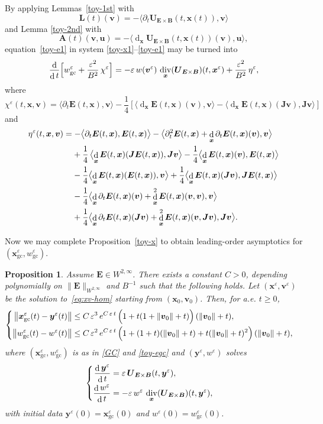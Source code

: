 \documentclass[JEP,XML,SOM,Unicode]{cedram}
\newenvironment{splitcases}
{\begin{cases}\begin{aligned}}
{\end{aligned}\end{cases}}
\newcommand{\blangle}{\bigl\langle}
\newcommand{\brangle}{\bigr\rangle}
\let\eps\varepsilon
\let\d\partial
\DeclareMathOperator\dD{d}\let\dd\dD
\DeclareMathOperator{\Div}{div}
\theoremstyle{plain}
\newtheorem{proposition}[theorem]{Proposition}
\theoremstyle{definition}
\newcommand{\be}{\begin{equation}}
\newcommand{\ee}{\end{equation}}
\newcommand{\bpr}{\begin{proposition}}
\newcommand{\epr}{\end{proposition}}
\newcommand\bA{{\boldsymbol A}}
\newcommand\bB{{\boldsymbol B}}
\newcommand\bE{{\boldsymbol E}}
\newcommand\bJ{{\boldsymbol J}}
\newcommand\bL{{\boldsymbol L}}
\newcommand\bU{{\boldsymbol U}}
\newcommand\bfu{{\boldsymbol u}}
\newcommand\bfv{{\boldsymbol v}}
\newcommand\bfx{{\boldsymbol x}}
\newcommand\bfy{{\boldsymbol y}}
\let\e w
\newcommand{\GC}{\bfx_\mathrm{gc}}
\newcommand{\eGC}{w_\mathrm{gc}}
\newcommand{\EcB}{\bU_{\bE\times\bB}}
\begin{document}
By applying Lemmas~\ref{toy-1st} with
\[
\bL(t)(\bfv)=
-\blangle\d_t\EcB(t,\bfx(t)),\bfv\brangle
\]
and Lemma \ref{toy-2nd} with
\[
\bA(t)(\bfv,\bfu) =
-\blangle\dD_\bfx\EcB(t,\bfx(t))(\bfv),\bfu\brangle,
\]
equation~\eqref{toy-e1} in system \eqref{toy-x1}--\eqref{toy-e1} may be turned into
\be
\label{toy-e2}
\frac{\dD}{\dD t}\Bigl[\eGC^\eps+\frac{\eps^2}{B^2}\,\chi^\eps\Bigr]
=-\eps\,\e(\bfv^\eps)\,\Div_\bfx(\EcB)(t,\bfx^\eps)
+\frac{\eps^2}{B^2}\,\eta^\eps,
\ee
where
\[
\chi^\eps(t,\bfx,\bfv)=\blangle\d_t\bE(t,\bfx),\bfv\brangle
-\frac14\left[\blangle\dD_\bfx\bE(t,\bfx)(\bfv),\bfv\brangle
-\blangle\dD_\bfx\bE(t,\bfx)(\bJ\bfv),\bJ\bfv\brangle\right]
\]
and
\begin{align*}
\eta^\eps(t,\bfx,\bfv)
&=-\blangle\d_t\bE(t,\bfx),\bE(t,\bfx)\brangle
-\blangle\d_t^2\bE(t,\bfx)
+\dD_\bfx\d_t\bE(t,\bfx)(\bfv),\bfv\brangle\\
&\hspace*{3.8mm}+\frac14\,\blangle\dD_\bfx\bE(t,\bfx)(\bJ\bE(t,\bfx)),\bJ\bfv\brangle
-\frac14\blangle\dD_\bfx\bE(t,\bfx)(\bfv),\bE(t,\bfx)\brangle\\
&\hspace*{3.8mm}-\frac14\blangle\dD_\bfx\bE(t,\bfx)(\bE(t,\bfx)),\bfv\brangle
+\frac14\blangle\dD_\bfx\bE(t,\bfx)(\bJ\bfv),\bJ\bE(t,\bfx)\brangle\\
&\hspace*{3.8mm}-\frac14\blangle\dD_\bfx\d_t\bE(t,\bfx)(\bfv)
+\dD_\bfx^2\bE(t,\bfx)(\bfv,\bfv),\bfv\brangle\\
&\hspace*{3.8mm}+\frac14\blangle\dD_\bfx\d_t\bE(t,\bfx)(\bJ\bfv)
+\dD_\bfx^2\bE(t,\bfx)(\bfv,\bJ\bfv),\bJ\bfv\brangle.
\end{align*}

Now we may complete Proposition~\ref{toy-x} to obtain leading-order asymptotics for $(\GC^\eps,\eGC^\eps)$.

\bpr
\label{toy-xe}
Assume $\bE\in W^{2,\infty}$. There exists a constant $C>0$, depending
polynomially on $\|\bE\|_{W^{2,\infty}}$ and $B^{-1}$ such that the following holds. Let
$(\bfx^\eps,\bfv^\eps)$ be the solution to~\eqref{eq:xv-hom} starting from
$(\bfx_0,\bfv_0)$. Then, for a.e. $t\geq0$,
\[
\begin{splitcases}
\left\|\GC^\eps(t)-\bfy^\eps(t)\right\|
&\leq C\,\eps^3\,e^{C\,\eps\,t}
\,\Bigl(1+t(1+\|\bfv_0\|+t)\Bigr)\,(\|\bfv_0\|+t),
\\
\left\|\eGC^\eps(t)-\e^\eps(t)\right\|
&\leq C\,\eps^2\,e^{C\,\eps\,t}\,
\Bigl(1+(1+t)(\|\bfv_0\|+t)+t(\|\bfv_0\|+t)^2\Bigr)\,(\|\bfv_0\|+t),
\end{splitcases}
\]
where $(\GC^\eps,\eGC^\eps)$ is as in \eqref{GC} and \eqref{toy-egc} and $(\bfy^\eps,\e^\eps)$ solves
\be
\label{eq:mhv}
\begin{splitcases}
\frac{\dD\bfy^\eps}{\dD t}&= \eps\,\EcB(t,\bfy^\eps),
\\
\frac{\dD \e^\eps}{\dD t}&=-\eps\,\e^\eps\,\Div_\bfx(\EcB)(t,\bfy^\eps),
\end{splitcases}
\ee
with initial data $\bfy^\eps(0)= \GC^\eps(0)$ and $\e^\eps(0)=\eGC^\eps(0)$.
\epr
\end{document}
